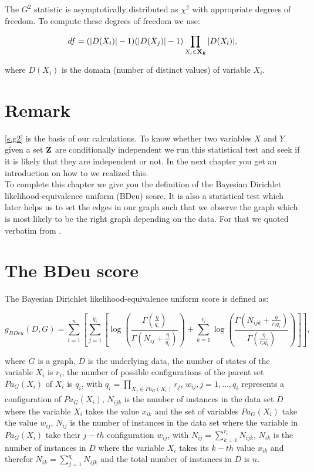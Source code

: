 		The $G^{2}$ statistic is asymptotically distributed as $\chi^{2}$ with appropriate degrees of freedom. To compute these degrees of freedom we use:

		\begin{equation}
			df = (|D(X_{i})| - 1)(|D(X_{j})| - 1) \prod_{X_{l} \in {\textbf{X}}_{{\textbf{k}}}} |D(X_{l})|,
		\end{equation}

		where $D(X_{i})$ is the domain (number of distinct values) of variable $X_{i}$.%

	\section*{Remark}

		\autoref{s.g2} is the basis of our calculations. To know whether two variables $X$ and $Y$ given a set ${\textbf{Z}}$ are conditionally independent we run this statistical test and seek if it is likely that they are independent or not. In the next chapter you get an introduction on how to we realized this. \\
		To complete this chapter we give you the definition of the Bayesian Dirichlet likelihood-equivalence uniform (BDeu) score. It is also a statistical test which later helps us to set the edges in our graph such that we observe the graph which is most likely to be the right graph depending on the data. For that we quoted verbatim from \cite{Ca06}.

	\section*{The BDeu score} \label{s.BDeu}

		The Bayesian Dirichlet likelihood-equivalence uniform score is defined as:

		\begin{equation}
			g_{BDeu}(D, G) = \sum_{i = 1}^{n} \left[ \sum_{j = 1}^{q_{i}} \left[ \log\left( \frac{\Gamma (\frac{\eta}{q_{i}})}{\Gamma (N_{ij} + \frac{\eta}{q_{i}})} \right) + \sum_{k = 1}^{r_{i}} \log \left( \frac{\Gamma (N_{ijk} + \frac{\eta}{r_{i} q_{i}})}{\Gamma (\frac{\eta}{r_{i} q_{i}})} \right) \right] \right],
		\end{equation}

		where $G$ is a graph, $D$ is the underlying data, the number of states of the variable $X_{i}$ is $r_{i}$, the number of possible configurations of the parent set $Pa_{G}(X_{i})$ of $X_{i}$ is $q_{i}$, with $q_{i} = \prod_{X_{j} \in Pa_{G}(X_{i})} r_{j}$, $w_{ij}, j = 1,...,q_{i}$ represents a configuration of $Pa_{G}(X_{i})$, $N_{ijk}$ is the number of instances in the data set $D$ where the variable $X_{i}$ takes the value $x_{ik}$ and the set of variables $Pa_{G}(X_{i})$ take the value $w_{ij}$, $N_{ij}$ is the number of instances in the data set where the variable in $Pa_{G}(X_{i})$ take their $j-th$ configuration $w_{ij}$, with $N_{ij} = \sum_{k = 1}^{r_{i}} N_{ijk}$, $N_{ik}$ is the number of instances in $D$ where the variable $X_{i}$ takes its $k-th$ value $x_{ik}$ and therefor $N_{ik} = \sum_{j = 1}^{q_{i}} N_{ijk}$ and the total number of instances in $D$ is $n$.


